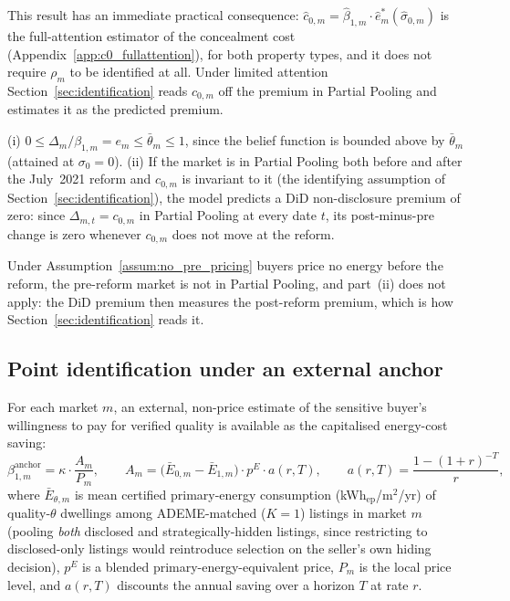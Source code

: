 This result has an immediate practical consequence: $\hat c_{0,m}=\hat\beta_{1,m}\cdot\hat
e^*_m(\hat\sigma_{0,m})$ is the full-attention estimator of the concealment cost (Appendix~\ref{app:c0_fullattention}), for both property types, and it does not require $\rho_m$ to
be identified at all. Under limited attention Section~\ref{sec:identification} reads $c_{0,m}$ off the premium in Partial Pooling and estimates it as the predicted premium.

\begin{lemma}
\label{lem:model_bounds}
(i) $0\le\Delta_m/\beta_{1,m}=e_m\le\bar\theta_m\le1$, since the belief function is bounded
above by $\bar\theta_m$ (attained at $\sigma_0=0$). (ii) If the market is in Partial Pooling both before and after the July~2021 reform and $c_{0,m}$ is
invariant to it (the identifying assumption of
Section~\ref{sec:identification}), the model predicts a DiD non-disclosure premium of zero:
since $\Delta_{m,t}=c_{0,m}$ in Partial Pooling at every date $t$, its post-minus-pre change is
zero whenever $c_{0,m}$ does not move at the reform.
\end{lemma}

\noindent Under Assumption~\ref{assum:no_pre_pricing} buyers price no energy before the reform, the pre-reform market is not in Partial Pooling, and part~(ii) does not apply: the DiD premium then measures the post-reform premium, which is how Section~\ref{sec:identification} reads it.

\subsection*{Point identification under an external anchor}

\begin{assumption}
\label{assum:energy_anchor}
For each market $m$, an external, non-price estimate of the sensitive buyer's willingness to
pay for verified quality is available as the capitalised energy-cost saving:
\begin{equation}
    \beta_{1,m}^{\mathrm{anchor}} = \kappa\cdot\frac{A_m}{P_m}, \qquad
    A_m = \big(\bar E_{0,m}-\bar E_{1,m}\big)\cdot p^E\cdot a(r,T), \qquad
    a(r,T)=\frac{1-(1+r)^{-T}}{r},
    \label{eq:energy_anchor}
\end{equation}
where $\bar E_{\theta,m}$ is mean certified primary-energy consumption (kWh$_{\mathrm{ep}}$/m$^2$/yr)
of quality-$\theta$ dwellings among ADEME-matched ($K=1$) listings in market $m$ (pooling
\emph{both} disclosed and strategically-hidden listings, since restricting to disclosed-only
listings would reintroduce selection on the seller's own hiding decision), $p^E$ is a
blended primary-energy-equivalent price, $P_m$ is the local price level, and $a(r,T)$ discounts
the annual saving over a horizon $T$ at rate $r$.
\end{assumption}


